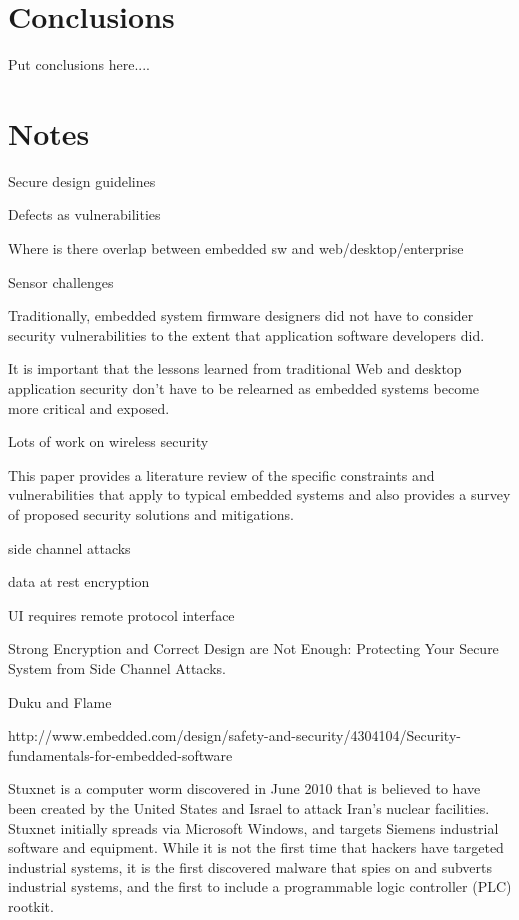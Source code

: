 \documentclass[draftcls,onecolumn,conference,12pt]{IEEEtran}
\begin{document}
\section{Conclusions}

Put conclusions here....



\pagebreak

\section{Notes}
Secure design guidelines

Defects as vulnerabilities 

Where is there overlap between embedded sw and web/desktop/enterprise

Sensor challenges

Traditionally, embedded system firmware designers did not have to consider security vulnerabilities to the extent that application software developers did.  

It is important that the lessons learned from traditional Web and desktop application security don't have to be relearned as embedded systems become more critical and exposed.

Lots of work on wireless security

This paper provides a literature review of the specific constraints and vulnerabilities that apply to typical embedded systems and also provides a survey of proposed security solutions and mitigations. 


side channel attacks

		data at rest encryption		

		UI requires remote protocol interface

		Strong Encryption and Correct Design are Not Enough: Protecting Your Secure System from Side Channel Attacks.

		Duku and Flame

http://www.embedded.com/design/safety-and-security/4304104/Security-fundamentals-for-embedded-software

		Stuxnet is a computer worm discovered in June 2010 that is believed to have been created by the United States and Israel to attack Iran's nuclear facilities. Stuxnet initially spreads via Microsoft Windows, and targets Siemens industrial software and equipment. While it is not the first time that hackers have targeted industrial systems, it is the first discovered malware that spies on and subverts industrial systems, and the first to include a programmable logic controller (PLC) rootkit.
\end{document}
